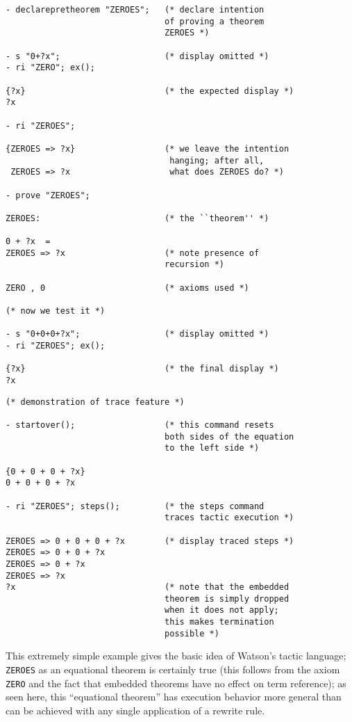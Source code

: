 \documentclass{kluwer}
\begin{document}
\begin{article}
\begin{verbatim}
- declarepretheorem "ZEROES";   (* declare intention 
                                of proving a theorem 
                                ZEROES *)

- s "0+?x";                     (* display omitted *)
- ri "ZERO"; ex();

{?x}                            (* the expected display *)
?x

- ri "ZEROES";

{ZEROES => ?x}                  (* we leave the intention
                                 hanging; after all,
 ZEROES => ?x                    what does ZEROES do? *) 

- prove "ZEROES";

ZEROES:                         (* the ``theorem'' *) 

0 + ?x  =  
ZEROES => ?x                    (* note presence of
                                recursion *)

ZERO , 0                        (* axioms used *)

(* now we test it *)

- s "0+0+0+?x";                 (* display omitted *)
- ri "ZEROES"; ex();

{?x}                            (* the final display *)
?x
\end{verbatim}

\newpage

\begin{verbatim}
(* demonstration of trace feature *)

- startover();                  (* this command resets 
                                both sides of the equation 
                                to the left side *)

{0 + 0 + 0 + ?x}
0 + 0 + 0 + ?x

- ri "ZEROES"; steps();         (* the steps command 
                                traces tactic execution *)

ZEROES => 0 + 0 + 0 + ?x        (* display traced steps *)
ZEROES => 0 + 0 + ?x
ZEROES => 0 + ?x
ZEROES => ?x
?x                              (* note that the embedded 
                                theorem is simply dropped 
                                when it does not apply; 
                                this makes termination 
                                possible *)
\end{verbatim}

This extremely simple example gives the basic idea of Watson's tactic
language; {\tt ZEROES} as an equational theorem is certainly true
(this follows from the axiom {\tt ZERO} and the fact that embedded
theorems have no effect on term reference); as seen here, this
``equational theorem'' has execution behavior more general than can be
achieved with any single application of a rewrite rule.


\end{article}
\end{document}
